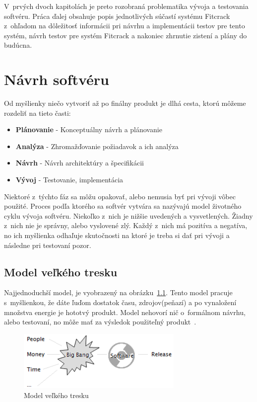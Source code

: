 V~prvých dvoch kapitolách je preto rozobraná problematika vývoja a testovania softvéru.
Práca ďalej obsahuje popis jednotlivých súčastí systému Fitcrack z~ohľadom na dôležitosť informácii pri návrhu a implementácii testov pre tento systém, návrh testov pre systém Fitcrack a nakoniec zhrnutie zistení a plány do budúcna.

\chapter{Návrh softvéru}
\label{tests_design}
Od myšlienky niečo vytvoriť až po finálny produkt je dlhá cesta, ktorú môžeme rozdeliť na tieto časti: 
\begin{itemize}
	\item \textbf{Plánovanie} - Konceptuálny návrh a plánovanie
	\item \textbf{Analýza} - Zhromažďovanie požiadavok a ich analýza
	\item \textbf{Návrh} - Návrh architektúry a špecifikácii
	\item \textbf{Vývoj} - Testovanie, implementácia
\end{itemize}
Niektoré z~týchto fáz sa môžu opakovať, alebo nemusia byť pri vývoji vôbec použité.
Proces podľa ktorého sa softvér vytvára sa nazývajú model životného cyklu vývoja softvéru.
Niekoľko z~nich je nižšie uvedených a vysvetlených.
Žiadny z~nich nie je správny, alebo vyslovené zlý.
Každý z~nich má pozitíva a negatíva, no ich myšlienka odhaľuje skutočnosti na ktoré je treba si dať pri vývoji a následne pri testovaní pozor.

\section{Model veľkého tresku}
\label{big_bang_model}
Najjednoduchší model, je vyobrazený na obrázku~\ref{big_bang_model_fig}.
Tento model pracuje s~myšlienkou, že dáte ľuďom dostatok času, zdrojov(peňazí) a po vynaložení množstva energie je hototvý produkt.
Model nehovorí nič o~formálnom návrhu, alebo testovaní, no môže mať za výsledok použiteľný produkt~\cite{Patton}.

\begin{figure}[h]
\centering
\includegraphics[width=8cm,keepaspectratio=true]{obrazky/big_bang_model.png}
\caption{Model veľkého tresku~\cite{models}}
\label{big_bang_model_fig}
\end{figure}

